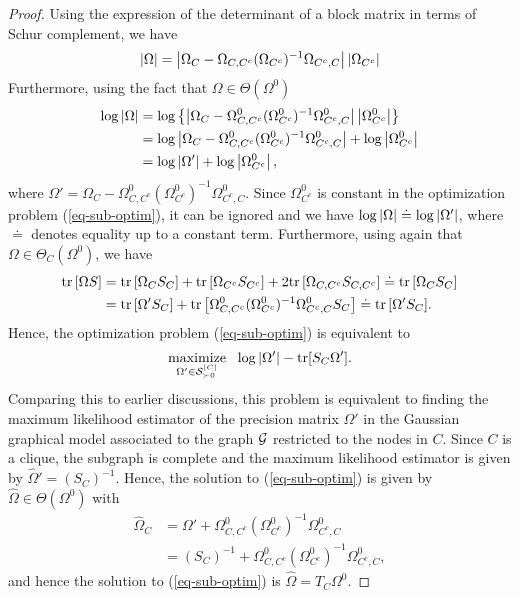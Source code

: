 \begin{proof}
    Using the expression of the determinant of a block matrix in terms of Schur complement, we have
    \begin{equation*}
        \left|\Omega\right| 
        = \left|\Omega_C - \Omega_{C, C^c}(\Omega_{C^c})^{-1}\Omega_{C^c, C}\right| \left|\Omega_{C^c}\right|
    \end{equation*}
    Furthermore, using the fact that $\Omega \in \Theta(\Omega^0)$
    \begin{align*}
        \log \left|\Omega\right|
        &= \log \left\{ \left|\Omega_C - \Omega^0_{C, C^c}(\Omega^0_{C^c})^{-1}\Omega^0_{C^c, C}\right| \left|\Omega^0_{C^c}\right| \right\}\\
        &= \log \left|\Omega_C - \Omega^0_{C, C^c}(\Omega^0_{C^c})^{-1}\Omega^0_{C^c, C}\right| + \log \left|\Omega^0_{C^c}\right|\\
        &= \log \left|\Omega'\right| + \log \left|\Omega^0_{C^c}\right|,
    \end{align*}
    where $\Omega' = \Omega_C - \Omega^0_{C, C^c}(\Omega^0_{C^c})^{-1}\Omega^0_{C^c, C}$. Since $\Omega^0_{C^c}$ is constant in the optimization problem (\ref{eq-sub-optim}), it can be ignored and we have $\log \left|\Omega\right| \doteq \log \left|\Omega'\right|$, where $\doteq$ denotes equality up to a constant term. Furthermore, using again that $\Omega \in \Theta_C(\Omega^0)$, we have
    \begin{align*}
        {\textrm{tr}\left[\Omega S\right]}
        &= {\textrm{tr}\left[\Omega_C S_C\right]} + {\textrm{tr}\left[\Omega_{C^c} S_{C^c}\right]} + 2 {\textrm{tr}\left[\Omega_{C,C^c} S_{C,C^c}\right]} 
        \doteq {\textrm{tr}\left[\Omega_C S_C\right]} \\
        &= {\textrm{tr}\left[\Omega'S_C\right]} + {\textrm{tr}\left[\Omega^0_{C, C^c}(\Omega^0_{C^c})^{-1}\Omega^0_{C^c, C}S_C\right]}
        \doteq  {\textrm{tr}\left[\Omega'S_C\right]}.
    \end{align*}
    Hence, the optimization problem (\ref{eq-sub-optim}) is equivalent to 
    \begin{equation*}
        \underset{\Omega' \in {\mathcal{S}}_{\succ 0}^{|C|}}{{\textrm{maximize}}}\ \  \log |\Omega'| - {\textrm{tr}}[S_C\Omega'].
    \end{equation*}
    Comparing this to earlier discussions, this problem is equivalent to finding the maximum likelihood estimator of the precision matrix $\Omega'$ in the Gaussian graphical model associated to the graph ${\mathcal{G}}$ restricted to the nodes in $C$. Since $C$ is a clique, the subgraph is complete and the maximum likelihood estimator is given by $\hat\Omega' = (S_C)^{-1}$. Hence, the solution to (\ref{eq-sub-optim}) is given by $\hat\Omega \in \Theta(\Omega^0)$ with
    \begin{align*}
        \hat\Omega_C
        &= \Omega' + \Omega^0_{C, C^c}(\Omega^0_{C^c})^{-1}\Omega^0_{C^c, C}\\
        &= (S_C)^{-1} + \Omega^0_{C, C^c}(\Omega^0_{C^c})^{-1}\Omega^0_{C^c, C},
    \end{align*}
    and hence the solution to (\ref{eq-sub-optim}) is $\hat\Omega = T_C \Omega^0$.
\end{proof}

